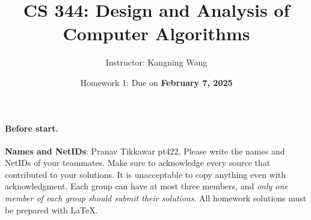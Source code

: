 \documentclass[12pt]{article}
\title{\vspace{-1.5cm}CS 344: Design and Analysis of Computer Algorithms\vspace{-0.5cm}}
\author{Instructor: Kangning Wang}
\date{\vspace{-0.2cm}\Large{Homework 1: Due on \textbf{February 7, 2025}}}
\begin{document}
\maketitle

\paragraph{Before start.}
\textbf{Names and NetIDs}: Pranav Tikkawar pt422, 
Please write the names and NetIDs of your teammates. Make sure to acknowledge every source that contributed to your solutions. It is unacceptable to copy anything even with acknowledgment. Each group can have at most three members, and \emph{only one member of each group should submit their solutions}. All homework solutions must be prepared with \LaTeX.



\end{document}
